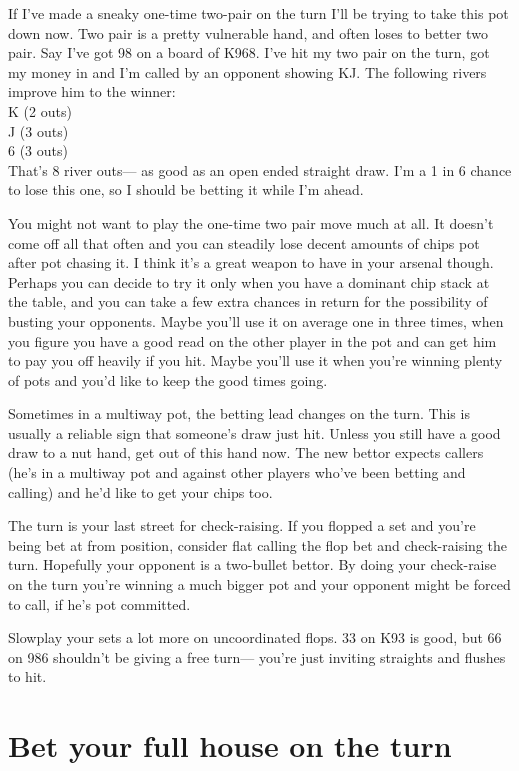 If I've made a sneaky one-time two-pair on the turn I'll be trying to
take this pot down now. Two pair is a pretty vulnerable hand, and
often loses to better two pair. Say I've got 98 on a board of K968.
I've hit my two pair on the turn, got my money in and I'm called by
an opponent showing KJ. The following rivers improve him to the winner: \\
K (2 outs) \\
J (3 outs) \\
6 (3 outs) \\

That's 8 river outs--- as good as an open ended straight draw. I'm a 1 in 6
chance to lose this one, so I should be betting it while I'm ahead.

You might not want to play the one-time two pair move much at all.
It doesn't come off all that often and you can steadily lose decent
amounts of chips pot after pot chasing it. I think it's
a great weapon to have in your arsenal though. Perhaps you
can decide to try it only when you have a dominant chip stack at
the table, and you can take a few extra chances in return for the
possibility of busting your opponents. Maybe you'll use it on average
one in three times, when you figure you have a good read on
the other player in the pot and can get him to pay you off heavily
if you hit. Maybe you'll use it when you're winning plenty of pots
and you'd like to keep the good times going.

Sometimes in a multiway pot, the betting lead changes on the turn.
This is usually a reliable sign that someone's draw just hit. Unless
you still have a good draw to a nut hand, get out of this hand now.
The new bettor expects callers (he's in a multiway pot and against
other players who've been betting and calling) and he'd like to
get your chips too.

The turn is your last street for check-raising. If you flopped a set
and you're being bet at from position, consider flat calling the
flop bet and check-raising the turn. Hopefully your opponent
is a two-bullet bettor. By doing your check-raise on the turn
you're winning a much bigger pot and your opponent might be
forced to call, if he's pot committed.

Slowplay your sets a lot more on uncoordinated flops. 33 on K93 is good,
but 66 on 986 shouldn't be giving a free turn--- you're just inviting straights
and flushes to hit.

\section{Bet your full house on the turn}

